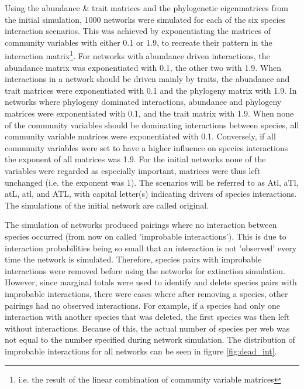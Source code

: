\documentclass[12pt,a4paper]{article}
\begin{document}
	Using the abundance \& trait matrices and the phylogenetic eigenmatrices from the initial simulation, 1000 networks were simulated for each of the six species interaction scenarios. This was achieved by exponentiating the matrices of community variables with either 0.1 or 1.9, to recreate their pattern in the interaction matrix\footnote{i.e. the result of the linear combination of community variable matrices}. For networks with abundance driven interactions, the abundance matrix was exponentiated with 0.1, the other two with 1.9. When interactions in a network should be driven mainly by traits, the abundance and trait matrices were exponentiated with 0.1 and the phylogeny matrix with 1.9. In networks where phylogeny dominated interactions, abundance and phylogeny matrices were exponentiated with 0.1, and the trait matrix with 1.9. When none of the community variables should be dominating interactions between species, all community variable matrices were exponentiated with 0.1. Conversely, if all community variables were set to have a higher influence on species interactions the exponent of all matrices was 1.9. For the initial networks none of the variables were regarded as especially important, matrices were thus left unchanged (i.e. the exponent was 1). The scenarios will be referred to as Atl, aTl, atL, atl, and ATL, with capital letter(s) indicating drivers of species interactions. The simulations of the initial network are called original.\par
	
	 The simulation of networks produced pairings where no interaction between species occurred (from now on called 'improbable interactions'). This is due to interaction probabilities being so small that an interaction is not 'observed' every time the network is simulated. Therefore, species pairs with improbable interactions were removed before using the networks for extinction simulation. However, since marginal totals were used to identify and delete species pairs with improbable interactions, there were cases where after removing a species, other pairings had no observed interactions. For example, if a species had only one interaction with another species that was deleted, the first species was then left without interactions. Because of this, the actual number of species per web was not equal to the number specified during network simulation. The distribution of improbable interactions for all networks can be seen in figure \ref{fig:dead_int}.
\end{document}
